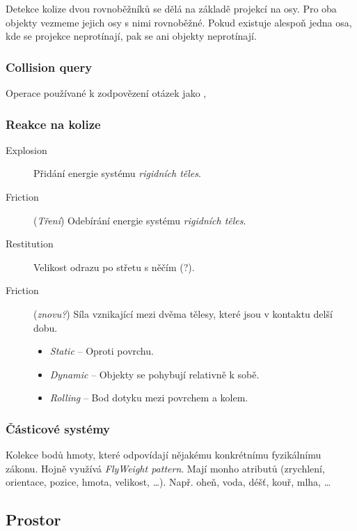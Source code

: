 Detekce kolize dvou rovnoběžníků se dělá na základě projekcí na osy.
Pro oba objekty vezmeme jejich osy s nimi rovnoběžné.
Pokud existuje alespoň jedna osa, kde se projekce neprotínají, pak se ani objekty neprotínají.

\subsubsection*{Collision query}

Operace používané k zodpovězení otázek jako , 

\subsubsection*{Reakce na kolize}

\begin{description}
    \item[Explosion] Přidání energie systému \textit{rigidních těles}.
    \item[Friction] (\textit{Tření}) Odebírání energie systému \textit{rigidních těles}.
    \item[Restitution] Velikost odrazu po střetu s něčím (?).
    \item[Friction] (\textit{znovu?}) Síla vznikající mezi dvěma tělesy, které jsou v kontaktu delší dobu.
    \begin{itemize}
        \item \textit{Static} -- Oproti povrchu.
        \item \textit{Dynamic} -- Objekty se pohybují relativně k sobě.
        \item \textit{Rolling} -- Bod dotyku mezi povrchem a kolem.
    \end{itemize}
\end{description}

\subsubsection*{Částicové systémy}

Kolekce bodů hmoty, které odpovídají nějakému konkrétnímu fyzikálnímu zákonu.
Hojně využívá \textit{FlyWeight pattern}.
Mají monho atributů (zrychlení, orientace, pozice, hmota, velikost, \dots).
Např. oheň, voda, déšť, kouř, mlha, \dots

\subsection*{Prostor}

